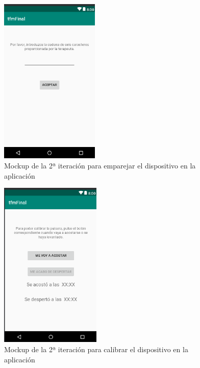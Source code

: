\begin{figure}[H]
    \centering
    \begin{minipage}{.45\textwidth}
        \centering
        \includegraphics[width=0.9\linewidth, height=8cm]{Imagenes/04DescProblema/mockups/v2/android/03-emparejar.png}
        \caption[Mockup de la 2ª iteración para emparejar el dispositivo en la aplicación]{Mockup de la 2ª iteración para emparejar el dispositivo en la aplicación}
        \label{c4:fig:v2:android:emparejar}
    \end{minipage}
\end{figure}

\begin{figure}[H]
    \centering
    \begin{minipage}{.45\textwidth}
        \centering
        \includegraphics[width=0.9\linewidth, height=8cm]{Imagenes/04DescProblema/mockups/v2/android/04-calibrar.png}
        \caption[Mockup de la 2ª iteración para calibrar el dispositivo en la aplicación]{Mockup de la 2ª iteración para calibrar el dispositivo en la aplicación}
        \label{c4:fig:v2:android:calibrar}
    \end{minipage}
\end{figure}

